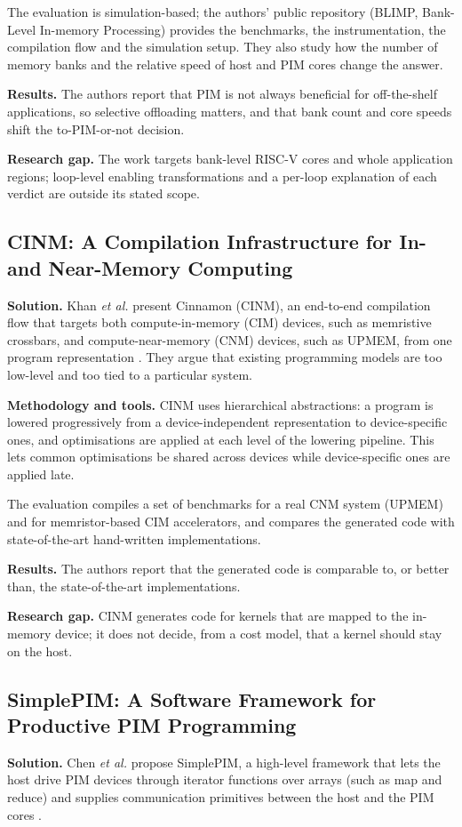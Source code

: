 \documentclass{ieeeaccess}
\begin{document}
The evaluation is simulation-based; the authors' public repository (BLIMP, Bank-Level In-memory Processing) provides the benchmarks, the instrumentation, the compilation flow and the simulation setup. They also study how the number of memory banks and the relative speed of host and PIM cores change the answer.

\textbf{Results.} The authors report that PIM is not always beneficial for off-the-shelf applications, so selective offloading matters, and that bank count and core speeds shift the to-PIM-or-not decision.

\textbf{Research gap.} The work targets bank-level RISC-V cores and whole application regions; loop-level enabling transformations and a per-loop explanation of each verdict are outside its stated scope.

\subsection{CINM: A Compilation Infrastructure for In- and Near-Memory Computing}
\textbf{Solution.} Khan \emph{et al.} present Cinnamon (CINM), an end-to-end compilation flow that targets both compute-in-memory (CIM) devices, such as memristive crossbars, and compute-near-memory (CNM) devices, such as UPMEM, from one program representation \cite{khan2023cinm}. They argue that existing programming models are too low-level and too tied to a particular system.

\textbf{Methodology and tools.} CINM uses hierarchical abstractions: a program is lowered progressively from a device-independent representation to device-specific ones, and optimisations are applied at each level of the lowering pipeline. This lets common optimisations be shared across devices while device-specific ones are applied late.

The evaluation compiles a set of benchmarks for a real CNM system (UPMEM) and for memristor-based CIM accelerators, and compares the generated code with state-of-the-art hand-written implementations.

\textbf{Results.} The authors report that the generated code is comparable to, or better than, the state-of-the-art implementations.

\textbf{Research gap.} CINM generates code for kernels that are mapped to the in-memory device; it does not decide, from a cost model, that a kernel should stay on the host.

\subsection{SimplePIM: A Software Framework for Productive PIM Programming}
\textbf{Solution.} Chen \emph{et al.} propose SimplePIM, a high-level framework that lets the host drive PIM devices through iterator functions over arrays (such as map and reduce) and supplies communication primitives between the host and the PIM cores \cite{chen2023simplepim}.
\end{document}
